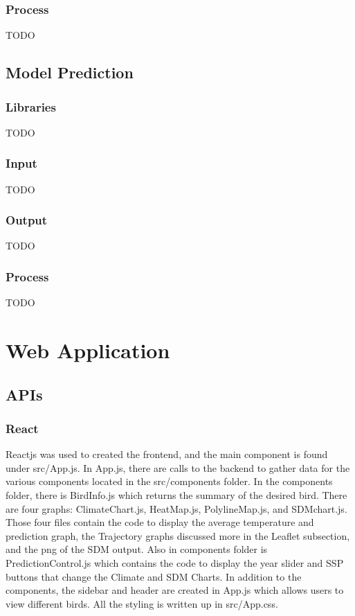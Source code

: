 \documentclass{article}
\begin{document}
\subsubsection*{Process}
TODO

\subsection{Model Prediction}

\subsubsection*{Libraries}
TODO

\subsubsection*{Input}
TODO

\subsubsection*{Output}
TODO

\subsubsection*{Process}
TODO

\newpage

\section{Web Application}

\subsection{APIs}

\subsubsection*{React}
Reactjs was used to created the frontend, and the main component is found under src/App.js. In App.js, there are calls to the backend to gather data for the various components
located in the src/components folder. In the components folder, there is BirdInfo.js which returns the summary of the desired bird. There are four graphs: ClimateChart.js,
HeatMap.js, PolylineMap.js, and SDMchart.js. Those four files contain the code to display the average temperature and prediction graph, the Trajectory graphs discussed more 
in the Leaflet subsection, and the png of the SDM output. Also in components folder is PredictionControl.js which contains the code to display the year slider and SSP buttons that 
change the Climate and SDM Charts. In addition to the components, the sidebar and header are created in App.js which allows users to view different birds. All the styling is written 
up in src/App.css. 
\end{document}
